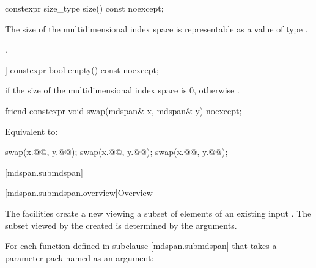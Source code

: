 %
\begin{itemdecl}
constexpr size_type size() const noexcept;
\end{itemdecl}

\begin{itemdescr}
\pnum
\expects
The size of the multidimensional index space 
is representable as a value of type .

\pnum
\returns
{}.
\end{itemdescr}

%
\begin{itemdecl}
[[nodiscard]] constexpr bool empty() const noexcept;
\end{itemdecl}

\begin{itemdescr}
\pnum
\returns
{}
if the size of the multidimensional index space  is 0,
otherwise .
\end{itemdescr}

%
\begin{itemdecl}
friend constexpr void swap(mdspan& x, mdspan& y) noexcept;
\end{itemdecl}

\begin{itemdescr}
\pnum
\effects
Equivalent to:
\begin{codeblock}
swap(x.@@, y.@@);
swap(x.@@, y.@@);
swap(x.@@, y.@@);
\end{codeblock}
\end{itemdescr}

[mdspan.submdspan]{}

[mdspan.submdspan.overview]{Overview}

\pnum
The  facilities create a new 
viewing a subset of elements of an existing input .
The subset viewed by the created  is determined by
the  arguments.

\pnum
For each function defined in subclause \ref{mdspan.submdspan} that
takes a parameter pack named  as an argument:

